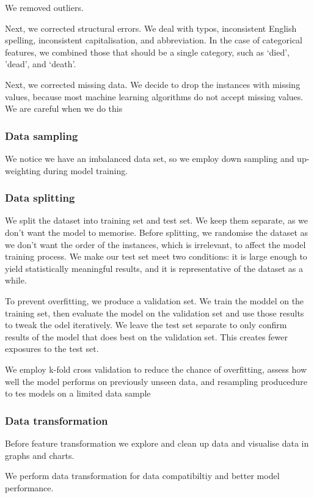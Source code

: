 \documentclass[twoside,11pt]{article}
\begin{document}
We removed outliers.

Next, we corrected structural errors. We deal with typos, inconsistent English spelling, inconsistent capitalisation, and abbreviation. In the case of categorical features, we combined those that should be a single category, such as `died', 'dead', and `death'.

Next, we corrected missing data. We decide to drop the instances with missing values, because most machine learning algorithms do not accept missing values. We are careful when we do this

\subsubsection{Data sampling}

We notice we have an imbalanced data set, so we employ down sampling and up-weighting during model training.

\subsubsection{Data splitting}
We split the dataset into training set and test set. We keep them separate, as we don't want the model to memorise. Before splitting, we randomise the dataset as we don't want the order of the instances, which is irrelevant, to affect the model training process. We make our test set meet two conditions: it is large enough to yield statistically meaningful results, and it is representative of the dataset as a while.

To prevent overfitting, we produce a validation set. We train the moddel on the training set, then evaluate the model on the validation set and use those results to tweak the odel iteratively. We leave the test set separate to only confirm results of the model that does best on the validation set. This creates fewer exposures to the test set.

We employ k-fold cross validation to reduce the chance of overfitting, assess how well the model performs on previously unseen data, and resampling producedure to tes models on a limited data sample

\subsubsection{Data transformation}
Before feature transformation we explore and clean up data and visualise data in graphs and charts.

We perform data transformation for data compatibiltiy and better model performance.
\end{document}
